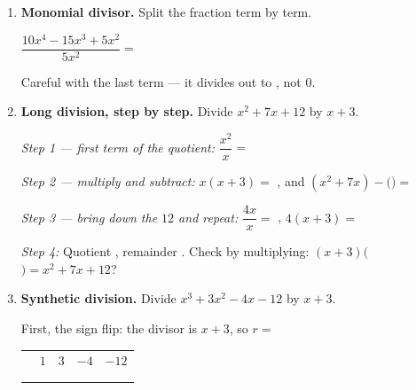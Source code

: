 \documentclass[10pt]{article}
\begin{document}
\begin{tcolorbox}[colback=white, colframe=black!40, title=\textbf{Tier R --- Remediate},
    fonttitle=\bfseries, arc=1.5mm, left=3mm, right=3mm, top=2mm, bottom=2mm, breakable]
\begin{enumerate}[leftmargin=1.7em, itemsep=9pt]
  \item \textbf{Monomial divisor.} Split the fraction term by term.

    \vspace{2pt}
    $\dfrac{10x^4 - 15x^3 + 5x^2}{5x^2} = $ 

    \vspace{2pt}
    Careful with the last term --- it divides out to , not $0$.

  \item \textbf{Long division, step by step.} Divide $x^2 + 7x + 12$ by $x + 3$.

    \vspace{3pt}
    \emph{Step 1 --- first term of the quotient:} $\dfrac{x^2}{x} = $ 

    \vspace{3pt}
    \emph{Step 2 --- multiply and subtract:} $x(x+3) = $ , and
    $(x^2+7x) - ($$) = $ 

    \vspace{3pt}
    \emph{Step 3 --- bring down the $12$ and repeat:} $\dfrac{4x}{x} = $ , \;
    $4(x+3) = $ 

    \vspace{3pt}
    \emph{Step 4:} Quotient , remainder . \; Check by multiplying:
    $(x+3)($$) = x^2+7x+12$? 

  \item \textbf{Synthetic division.} Divide $x^3 + 3x^2 - 4x - 12$ by $x + 3$.

    \vspace{3pt}
    First, the sign flip: the divisor is $x + 3$, so $r = $ 
    \begin{center}
    \renewcommand{\arraystretch}{1.6}
    \begin{tabular}{r|C{1.4cm}C{1.4cm}C{1.4cm}C{1.4cm}}
     & $1$ & $3$ & $-4$ & $-12$ \\
        &     &  &  &  \\ 
        &  &  &  &  \\
    \end{tabular}
    \end{center}


\end{enumerate}
\end{tcolorbox}
\end{document}
